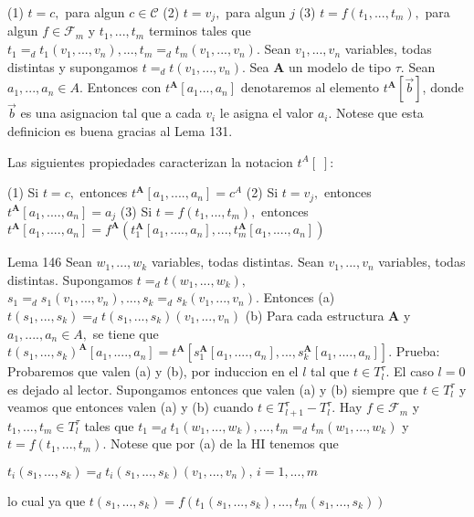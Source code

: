 (1) \(t=c,\) para algun \(c\in \mathcal{C}\)
(2) \(t=v_{j},\) para algun \(j\)
(3) \(t=f(t_{1},...,t_{m}),\) para algun \(f\in \mathcal{F}_{m}\) y \( t_{1},...,t_{m}\) terminos tales que \( t_{1}=_{d}t_{1}(v_{1},...,v_{n}),...,t_{m}=_{d}t_{m}(v_{1},...,v_{n}).\)
Sean \(v_{1},...,v_{n}\) variables, todas distintas y supongamos \( t=_{d}t(v_{1},...,v_{n})\). Sea \(\mathbf{A}\) un modelo de tipo \(\tau \). Sean \( a_{1},...,a_{n}\in A\). Entonces con \(t^{\mathbf{A}}[a_{1}...,a_{n}]\) denotaremos al elemento \(t^{\mathbf{A}}[\vec{b}]\), donde \(\vec{b}\) es una asignacion tal que a cada \(v_{i}\) le asigna el valor \(a_{i}.\) Notese que esta definicion es buena gracias al Lema 131.

Las siguientes propiedades caracterizan la notacion \(t^{A}[\;]\):

(1) Si \(t=c,\) entonces \(t^{\mathbf{A}}[a_{1},....,a_{n}]=c^{A}\)
(2) Si \(t=v_{j},\) entonces \(t^{\mathbf{A}}[a_{1},....,a_{n}]=a_{j}\)
(3) Si \(t=f(t_{1},...,t_{m}),\) entonces
\(\displaystyle t^{\mathbf{A}}[a_{1},....,a_{n}]=f^{\mathbf{A}}(t_{1}^{\mathbf{A} }[a_{1},....,a_{n}],...,t_{m}^{\mathbf{A}}[a_{1},....,a_{n}]) \)

Lema 146 Sean \(w_{1},...,w_{k}\) variables, todas distintas. Sean \( v_{1},...,v_{n}\) variables, todas distintas. Supongamos \( t=_{d}t(w_{1},...,w_{k}),\) \( s_{1}=_{d}s_{1}(v_{1},...,v_{n}),...,s_{k}=_{d}s_{k}(v_{1},...,v_{n}).\) Entonces
(a) \(t(s_{1},...,s_{k})=_{d}t(s_{1},...,s_{k})(v_{1},...,v_{n})\)
(b) Para cada estructura \(\mathbf{A}\) y \(a_{1},....,a_{n}\in A,\) se tiene que
\(\displaystyle t(s_{1},...,s_{k})^{\mathbf{A}}[a_{1},....,a_{n}]=t^{\mathbf{A}}[s_{1}^{ \mathbf{A}}[a_{1},....,a_{n}],...,s_{k}^{\mathbf{A}}[a_{1},....,a_{n}]]. \)
Prueba: Probaremos que valen (a) y (b), por induccion en el \(l\) tal que \(t\in T_{l}^{\tau }.\) El caso \(l=0\) es dejado al lector. Supongamos entonces que valen (a) y (b) siempre que \(t\in T_{l}^{\tau }\) y veamos que entonces valen (a) y (b) cuando \(t\in T_{l+1}^{\tau }-T_{l}^{\tau }\). Hay \(f\in \mathcal{F} _{m}\) y \(t_{1},...,t_{m}\in T_{l}^{\tau }\) tales que \( t_{1}=_{d}t_{1}(w_{1},...,w_{k}),...,t_{m}=_{d}t_{m}(w_{1},...,w_{k})\) y \( t=f(t_{1},...,t_{m})\). Notese que por (a) de la HI tenemos que

\(\displaystyle t_{i}(s_{1},...,s_{k})=_{d}t_{i}(s_{1},...,s_{k})(v_{1},...,v_{n})\text{, } i=1,...,m \)

lo cual ya que
\(\displaystyle t(s_{1},...,s_{k})=f(t_{1}(s_{1},...,s_{k}),...,t_{m}(s_{1},...,s_{k})) \)


